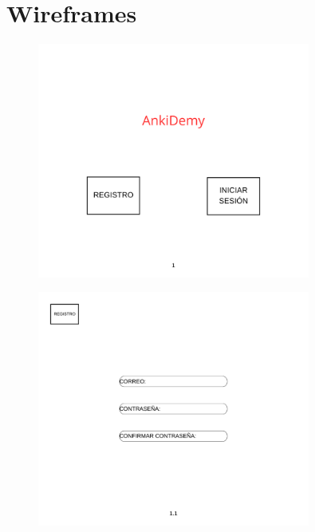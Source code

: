\documentclass{report}
\begin{document}
\chapter{Wireframes}

\begin{figure}[H]
    \centering
    \includegraphics[width=0.8\textwidth]{./Diagramas/1.png}
\end{figure}

\begin{figure}[H]
    \centering
    \includegraphics[width=0.8\textwidth]{./Diagramas/2.png}
\end{figure}
\end{document}
